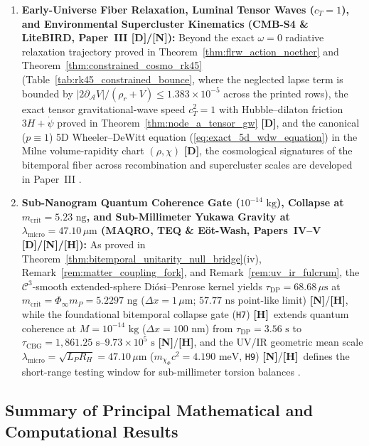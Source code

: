 \documentclass[11pt,a4paper]{article}
\newcommand{\catD}{\textbf{\textcolor{blue!75!black}{[D]}}}
\newcommand{\catH}{\textbf{\textcolor{orange!85!black}{[H]}}}
\newcommand{\catN}{\textbf{\textcolor{teal!75!black}{[N]}}}
\theoremstyle{definition}
\theoremstyle{remark}
\begin{document}
\begin{enumerate}
  \item \textbf{Early-Universe Fiber Relaxation, Luminal Tensor Waves ($c_T = 1$), and Environmental Supercluster Kinematics (CMB-S4 \& LiteBIRD, Paper~III \cite{JV_Paper3} \catD/\catN):} Beyond the exact $\omega = 0$ radiative relaxation trajectory proved in Theorem~\ref{thm:flrw_action_noether} and Theorem~\ref{thm:constrained_cosmo_rk45} (Table~\ref{tab:rk45_constrained_bounce}, where the neglected lapse term is bounded by $|2\partial_{\mathcal{A}}V|/(\rho_r + V) \le 1.383 \times 10^{-5}$ across the printed rows), the exact tensor gravitational-wave speed $c_T^2 = 1$ with Hubble--dilaton friction $3H + \dot{\psi}$ proved in Theorem~\ref{thm:node_a_tensor_gw} \catD, and the canonical ($p \equiv 1$) 5D Wheeler--DeWitt equation (\ref{eq:exact_5d_wdw_equation}) in the Milne volume-rapidity chart $(\rho, \chi)$ \catD, the cosmological signatures of the bitemporal fiber across recombination and supercluster scales are developed in Paper~III \cite{JV_Paper3}.
  \item \textbf{Sub-Nanogram Quantum Coherence Gate ($10^{-14}\text{ kg}$), Collapse at $m_{\text{crit}} = 5.23\text{ ng}$, and Sub-Millimeter Yukawa Gravity at $\lambda_{\text{micro}} = 47.10\,\mu\text{m}$ (MAQRO, TEQ \& E\"ot-Wash, Papers~IV--V \cite{JV_Paper4,JV_Paper5} \catD/\catN/\catH):} As proved in Theorem~\ref{thm:bitemporal_unitarity_null_bridge}(iv), Remark~\ref{rem:matter_coupling_fork}, and Remark~\ref{rem:uv_ir_fulcrum}, the $\mathcal{C}^3$-smooth extended-sphere Di\'osi--Penrose kernel yields $\tau_{\text{DP}} = 68.68\,\mu\text{s}$ at $m_{\text{crit}} = \Phi_{\infty} m_P = 5.2297\text{ ng}$ ($\Delta x = 1\,\mu\text{m}$; $57.77\text{ ns}$ point-like limit) \catN/\catH, while the foundational bitemporal collapse gate (\texttt{H7}) \catH\ extends quantum coherence at $M = 10^{-14}\text{ kg}$ ($\Delta x = 100\text{ nm}$) from $\tau_{\text{DP}} = 3.56\text{ s}$ to $\tau_{\text{CBG}} = 1{,}861.25\text{ s}\text{--}9.73\times 10^5\text{ s}$ \catN/\catH, and the UV/IR geometric mean scale $\lambda_{\text{micro}} = \sqrt{L_P R_H} = 47.10\,\mu\text{m}$ ($m_{\chi_{\Phi}}c^2 = 4.190\text{ meV}$, \texttt{H9}) \catN/\catH\ defines the short-range testing window for sub-millimeter torsion balances \cite{Kapner2007_EotWash}.
\end{enumerate}

\subsection{\texorpdfstring{Summary of Principal Mathematical and Computational Results}{Summary of Principal Mathematical and Computational Results}}
\end{document}
